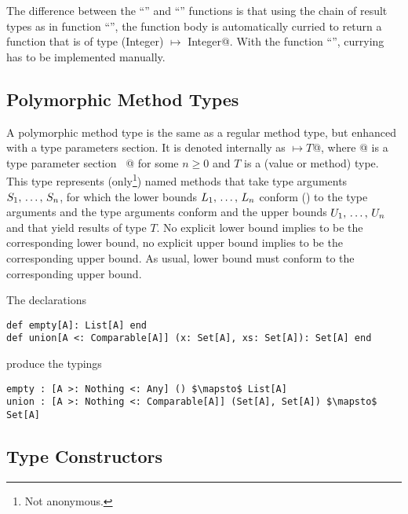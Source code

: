 The difference between the ``'' and ``'' functions is that using the chain of result types as in function ``'', the function body is automatically curried to return a function that is of type \lstinline@(Integer) $\mapsto$ Integer@. With the function ``'', currying has to be implemented manually. 






\subsection{Polymorphic Method Types}
\label{sec:polymorphic-method-types}

A polymorphic method type is the same as a regular method type, but enhanced with a type parameters section. It is denoted internally as \lstinline@[$\tps$]$ \mapsto T$@, where \lstinline@[$\tps$]@ is a type parameter section ~\lstinline@[$\pm a_1$ >: $L_1$ <: $U_1$ $\commadots$ $\pm a_n$ >: $L_n$ <: $U_n$]@ for some $n \geq 0$ and $T$ is a (value or method) type. This type represents (only\footnote{Not anonymous.}) named methods that take type arguments $S_1 ,\, \ldots ,\, S_n$, for which the lower bounds $L_1 ,\, \ldots ,\, L_n$ conform () to the type arguments and the type arguments conform and the upper bounds $U_1 ,\, \ldots ,\, U_n$ and that yield results of type $T$. No explicit lower bound implies  to be the corresponding lower bound, no explicit upper bound implies  to be the corresponding upper bound. As usual, lower bound must conform to the corresponding upper bound. 

\example The declarations
\begin{lstlisting}[escapechar=@,deletekeywords={union}]
def empty[A]: List[A] end
def union[A <: Comparable[A]] (x: Set[A], xs: Set[A]): Set[A] end
\end{lstlisting}
produce the typings
\begin{lstlisting}[escapechar=@,deletekeywords={union}]
empty : [A >: Nothing <: Any] () $\mapsto$ List[A]
union : [A >: Nothing <: Comparable[A]] (Set[A], Set[A]) $\mapsto$ Set[A]
\end{lstlisting}





\subsection{Type Constructors}
\label{sec:type-constructors}

